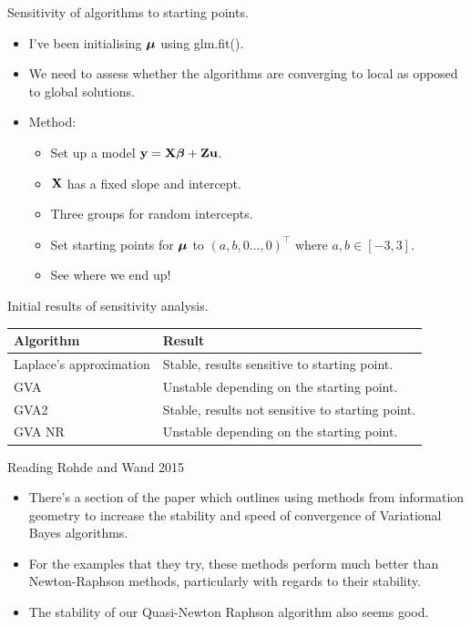 \documentclass{beamer}
\begin{document}
\begin{frame}{Sensitivity of algorithms to starting points.}
\begin{itemize}
\item I've been initialising ${\boldsymbol \mu}$ using glm.fit().
\item We need to assess whether the algorithms are converging to local as opposed to global solutions.
\item Method:
\begin{itemize}
\item Set up a model ${\bf y} = {\bf X} {\boldsymbol \beta} + {\bf Z} {\bf u}$.
\item ${\bf X}$ has a fixed slope and intercept.
\item Three groups for random intercepts.
\item Set starting points for ${\boldsymbol \mu}$ to $(a, b, 0 \ldots, 0)^\top$ where $a, b \in [-3, 3]$.
\item See where we end up!
\end{itemize}
\end{itemize}
\end{frame}

\begin{frame}{Initial results of sensitivity analysis.}
\begin{table}
\begin{tabular}{|l|p{6.5cm}|}
\hline
Algorithm & Result \\
\hline
Laplace's approximation & Stable, results sensitive to starting point. \\
GVA & Unstable depending on the starting point. \\
GVA2 & Stable, results not sensitive to starting point. \\
GVA NR & Unstable depending on the starting point. \\
\hline
\end{tabular}
\end{table}
\end{frame}

\begin{frame}{Reading Rohde and Wand 2015}
\begin{itemize}
\item There's a section of the paper which outlines using methods from information geometry to increase
			the stability and speed of convergence of Variational Bayes algorithms.
\item For the examples that they try, these methods perform much better than Newton-Raphson methods, particularly
			with regards to their stability.
\item The stability of our Quasi-Newton Raphson algorithm also seems good.
\end{itemize}
\end{frame}
\end{document}
